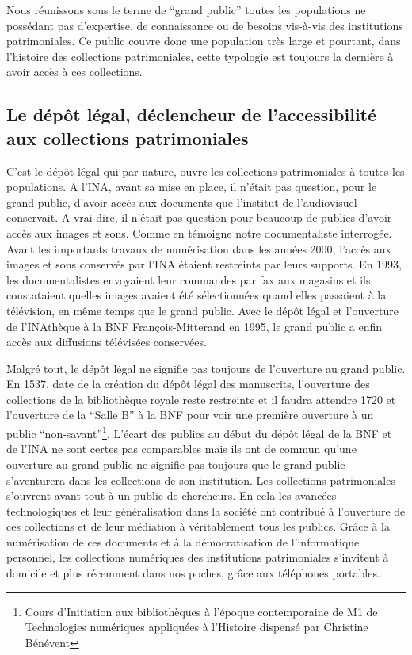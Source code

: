 
Nous réunissons sous le terme de \enquote{grand public} toutes les populations ne possédant pas d'expertise, de connaissance ou de besoins vis-à-vis des institutions patrimoniales. Ce public couvre donc une population très large et pourtant, dans l'histoire des collections patrimoniales, cette typologie est toujours la dernière à avoir accès à ces collections. 

\subsection{Le dépôt légal, déclencheur de l'accessibilité aux collections patrimoniales}


C'est le dépôt légal qui par nature, ouvre les collections patrimoniales à toutes les populations. A l'INA, avant sa mise en place, il n'était pas question, pour le grand public, d'avoir accès aux documents que l'institut de l'audiovisuel conservait. A vrai dire, il n'était pas question pour beaucoup de publics d'avoir accès aux images et sons. Comme en témoigne notre documentaliste interrogée. Avant les importants travaux de numérisation dans les années 2000, l'accès aux images et sons conservés par l'INA étaient restreints par leurs supports. En 1993, les documentalistes envoyaient leur commandes par fax aux magasins et ils constataient quelles images avaient été sélectionnées quand elles passaient à la télévision, en même temps que le grand public. Avec le dépôt légal et l'ouverture de l'INAthèque à la BNF François-Mitterand en 1995, le grand public a enfin accès aux diffusions télévisées conservées. 

Malgré tout, le dépôt légal ne signifie pas toujours de l'ouverture au grand public. En 1537, date de la création du dépôt légal des manuscrits, l'ouverture des collections de la bibliothèque royale reste restreinte et il faudra attendre 1720 et l'ouverture de la \enquote{Salle B} à la BNF pour voir une première ouverture à un public \enquote{non-savant}\footnote{Cours d'Initiation aux bibliothèques à l'époque contemporaine de M1 de Technologies numériques appliquées à l'Histoire dispensé par Christine Bénévent}. L'écart des publics au début du dépôt légal de la BNF et de l'INA ne sont certes pas comparables mais ils ont de commun qu'une ouverture au grand public ne signifie pas toujours que le grand public s'aventurera dans les collections de son institution. Les collections patrimoniales s'ouvrent avant tout à un public de chercheurs. En cela les avancées technologiques et leur généralisation dans la société ont contribué à l'ouverture de ces collections et de leur médiation à véritablement tous les publics. Grâce à la numérisation de ces documents et à la démocratisation de l'informatique personnel, les collections numériques des institutions patrimoniales s'invitent à domicile et plus récemment dans nos poches, grâce aux téléphones portables. 

